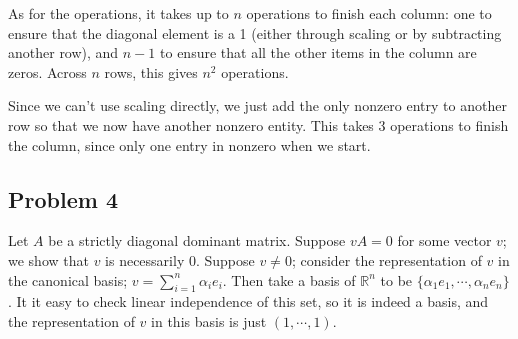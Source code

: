\documentclass{article}
\begin{document}
As for the operations, it takes up to $n$ operations to finish each column:
one to ensure that the diagonal element is a 1 (either through scaling or by
subtracting another row), and $n-1$ to ensure that all the other items in the
column are zeros. Across $n$ rows, this gives $n^2$ operations.

Since we can't use scaling directly, we just add the only nonzero entry to another row so that we now have another nonzero entity. This takes 3 operations to finish the column, since only one entry in nonzero when we start.

\subsection{Problem 4}
Let $A$ be a strictly diagonal dominant matrix. Suppose $vA=0$ for some vector $v$; we show that $v$ is necessarily 0. Suppose $v\neq 0$; consider the representation of $v$ in the canonical basis; $v=\displaystyle\sum_{i=1}^n \alpha_i e_i$. Then take a basis of $\mathbb{R}^n$ to be $\{\alpha_1 e_1,\cdots ,\alpha_n e_n\}$. It it easy to check linear independence of this set, so it is indeed a basis, and the representation of $v$ in this basis is just $(1,\cdots ,1)$. 
\end{document}
